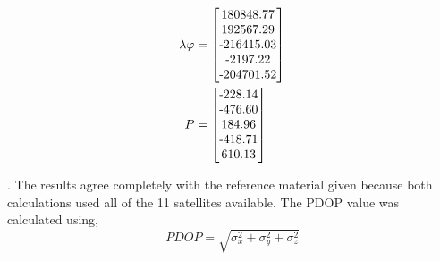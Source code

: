 \begin{align}
	\lambda \varphi &= 
	\left[\begin{matrix}
			$180848.77$ \\
			$192567.29$ \\
			$-216415.03$\\
			$-2197.22$\\
			$-204701.52$\\
	\end{matrix}\right]
	\label{eq:doubleDiffa} \\
	P &=  
	\left[\begin{matrix}
		$-228.14$\\
		$-476.60$\\
		$184.96$\\
		$-418.71$\\
		$610.13$\\
	\end{matrix}\right]
	\label{eq:doubleDiffb}
\end{align}

.  The results agree completely with the reference material given because both calculations used all of the 11 satellites available.  The PDOP value was calculated using,
\begin{equation*}
	PDOP = \sqrt{\sigma_x^2 + \sigma_y^2 + \sigma_z^2}
\end{equation*}

